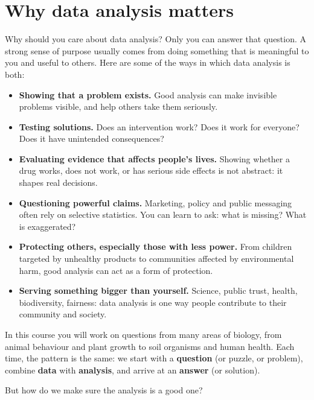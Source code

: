 \documentclass[
  letterpaper,
  8pt,
  a4paper]{book}
\providecommand{\tightlist}{%
  \setlength{\itemsep}{0pt}\setlength{\parskip}{0pt}}
\begin{document}
\section*{Why data analysis matters}\label{why-data-analysis-matters}


Why should you care about data analysis? Only you can answer that
question. A strong sense of purpose usually comes from doing something
that is meaningful to you and useful to others. Here are some of the
ways in which data analysis is both:

\begin{itemize}
\tightlist
\item
  \textbf{Showing that a problem exists.} Good analysis can make
  invisible problems visible, and help others take them seriously.
\item
  \textbf{Testing solutions.} Does an intervention work? Does it work
  for everyone? Does it have unintended consequences?
\item
  \textbf{Evaluating evidence that affects people's lives.} Showing
  whether a drug works, does not work, or has serious side effects is
  not abstract: it shapes real decisions.
\item
  \textbf{Questioning powerful claims.} Marketing, policy and public
  messaging often rely on selective statistics. You can learn to ask:
  what is missing? What is exaggerated?
\item
  \textbf{Protecting others, especially those with less power.} From
  children targeted by unhealthy products to communities affected by
  environmental harm, good analysis can act as a form of protection.
\item
  \textbf{Serving something bigger than yourself.} Science, public
  trust, health, biodiversity, fairness: data analysis is one way people
  contribute to their community and society.
\end{itemize}

In this course you will work on questions from many areas of biology,
from animal behaviour and plant growth to soil organisms and human
health. Each time, the pattern is the same: we start with a
\textbf{question} (or puzzle, or problem), combine \textbf{data} with
\textbf{analysis}, and arrive at an \textbf{answer} (or solution).

But how do we make sure the analysis is a good one?
\end{document}
